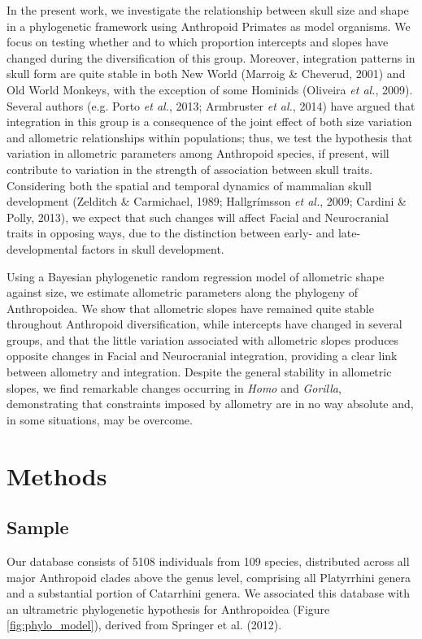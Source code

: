 \documentclass[12pt,twoside]{report}
\begin{document}
In the present work, we investigate the relationship between skull size
and shape in a phylogenetic framework using Anthropoid Primates as model
organisms. We focus on testing whether and to which proportion
intercepts and slopes have changed during the diversification of this
group. Moreover, integration patterns in skull form are quite stable in
both New World (Marroig \& Cheverud, 2001) and Old World Monkeys, with
the exception of some Hominids (Oliveira \emph{et al.}, 2009). Several
authors (e.g. Porto \emph{et al.}, 2013; Armbruster \emph{et al.}, 2014)
have argued that integration in this group is a consequence of the joint
effect of both size variation and allometric relationships within
populations; thus, we test the hypothesis that variation in allometric
parameters among Anthropoid species, if present, will contribute to
variation in the strength of association between skull traits.
Considering both the spatial and temporal dynamics of mammalian skull
development (Zelditch \& Carmichael, 1989; Hallgrímsson \emph{et al.},
2009; Cardini \& Polly, 2013), we expect that such changes will affect
Facial and Neurocranial traits in opposing ways, due to the distinction
between early- and late-developmental factors in skull development.

Using a Bayesian phylogenetic random regression model of allometric
shape against size, we estimate allometric parameters along the
phylogeny of Anthropoidea. We show that allometric slopes have remained
quite stable throughout Anthropoid diversification, while intercepts
have changed in several groups, and that the little variation associated
with allometric slopes produces opposite changes in Facial and
Neurocranial integration, providing a clear link between allometry and
integration. Despite the general stability in allometric slopes, we find
remarkable changes occurring in \emph{Homo} and \emph{Gorilla},
demonstrating that constraints imposed by allometry are in no way
absolute and, in some situations, may be overcome.

\section{Methods}\label{methods-1}

\subsection{Sample}\label{sample-1}

Our database consists of 5108 individuals from 109 species, distributed
across all major Anthropoid clades above the genus level, comprising all
Platyrrhini genera and a substantial portion of Catarrhini genera. We
associated this database with an ultrametric phylogenetic hypothesis for
Anthropoidea (Figure \ref{fig:phylo_model}), derived from Springer et
al. (2012).
\end{document}
